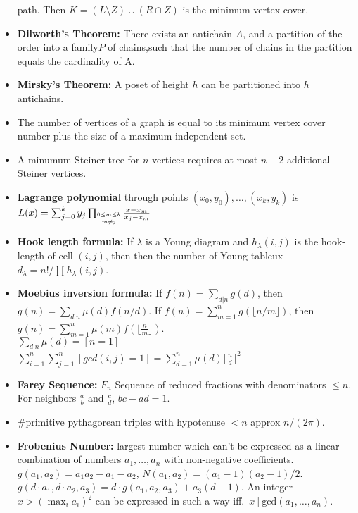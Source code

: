 \documentclass[15pt,a4paper]{article}
\begin{document}
\begin{landscape}
\begin{multicols*}{3}
\begin{itemize}
    path. Then $K=(L\setminus Z)\cup(R\cap Z)$ is the minimum
    vertex cover.
    \item \textbf{Dilworth's Theorem:} There exists an antichain $A$,
    and a partition of the order into a family$P$ of chains,such that the number
    of chains in the partition equals the cardinality of A.
    \item \textbf{Mirsky's Theorem:} A poset of height $h$ can be partitioned into $h$ antichains.
    \item The number of vertices of a graph is equal to its minimum
    vertex cover number plus the size of a maximum independent set.
    \item A minumum Steiner tree for $n$ vertices requires at most $n-2$ additional Steiner vertices.
    \item \textbf{Lagrange polynomial} through points $(x_0,y_0),\ldots,(x_k,y_k)$ is $L(x) = \sum_{j=0}^k y_j \prod_{\shortstack{$\scriptscriptstyle 0\leq m \leq k$ \\ $\scriptscriptstyle m\neq j$}} \frac{x-x_m}{x_j - x_m}$
    \item \textbf{Hook length formula:} If $\lambda$ is a Young diagram and $h_{\lambda}(i,j)$ is the hook-length of cell $(i,j)$, then then the number of Young tableux $d_{\lambda} = n!/\prod h_{\lambda}(i,j)$.
    \item \textbf{Moebius inversion formula:} If $f(n) = \sum_{d|n} g(d)$, then $g(n) = \sum_{d|n} \mu(d) f(n/d)$. If $f(n) = \sum_{m=1}^n g(\lfloor n/m\rfloor)$, then $g(n) = \sum_{m=1}^n \mu(m)f(\lfloor\frac{n}{m}\rfloor)$.
    \\$\sum_{d|n} \mu(d) = [n=1]$
    \\$\sum_{i=1}^n\sum_{j=1}^n[gcd(i,j)=1]= \sum_{d=1}^n\mu(d)\lfloor\frac{n}{d}\rfloor^2$
    \item \textbf{Farey Sequence:} $F_{n}$ Sequence of reduced fractions with denominators $\le n$. For neighbors $\frac{a}{b}$ and $\frac{c}{d}$, $bc-ad=1$.
    \item \#primitive pythagorean triples with hypotenuse $<n$ approx $n/(2\pi)$.
    \item \textbf{Frobenius Number:} largest number which can't be
    expressed as a linear combination of numbers $a_1,\ldots,a_n$
    with non-negative coefficients. $g(a_1,a_2) = a_1a_2-a_1-a_2$,
    $N(a_1,a_2)=(a_1-1)(a_2-1)/2$. $g(d\cdot a_1,d\cdot a_2,a_3) =
    d\cdot g(a_1,a_2,a_3) + a_3(d-1)$. An integer $x>\left(\max_i
    a_i\right)^2$ can be expressed in such a way iff.\ $x\ |\
    \mathrm{gcd}(a_1,\ldots,a_n)$.
\end{itemize}


\end{multicols*}
\end{landscape}
\end{document}
